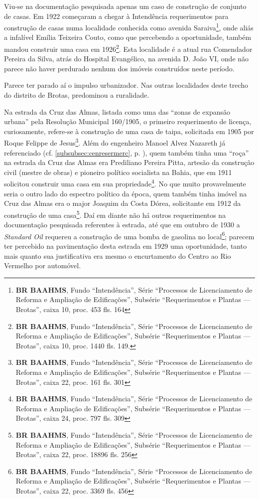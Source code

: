 Viu-se na documentação pesquisada apenas um caso de construção de conjunto de casas. Em 1922 começaram a chegar à Intendência requerimentos para construção de casas numa localidade conhecida como avenida Saraiva\footnote{\textbf{BR BAAHMS}, Fundo ``Intendência'', Série ``Processos de Licenciamento de Reforma e Ampliação de Edificações'', Subsérie ``Requerimentos e Plantas --- Brotas'', caixa 10, proc. 453 fls. 164}, onde aliás a infalível Emília Teixeira Couto, como que percebendo a oportunidade, também mandou construir uma casa em 1926\footnote{\textbf{BR BAAHMS}, Fundo ``Intendência'', Série ``Processos de Licenciamento de Reforma e Ampliação de Edificações'', Subsérie ``Requerimentos e Plantas --- Brotas'', caixa 10, proc. 1440 fls. 149.}. Esta localidade é a atual rua Comendador Pereira da Silva, atrás do Hospital Evangélico, na avenida D. João VI, onde não parece não haver perdurado nenhum dos imóveis construídos neste período.


Parece ter parado aí o impulso urbanizador. Nas outras localidades deste trecho do distrito de Brotas, predominou a ruralidade.

Na estrada da Cruz das Almas, listada como uma das ``zonas de expansão urbana'' pela Resolução Municipal 160/1905, o primeiro requerimento de licença, curiosamente, refere-se à construção de uma casa de taipa, solicitada em 1905 por Roque Felippe de Jesus\footnote{\textbf{BR BAAHMS}, Fundo ``Intendência'', Série ``Processos de Licenciamento de Reforma e Ampliação de Edificações'', Subsérie ``Requerimentos e Plantas --- Brotas'', caixa 22, proc. 161 fls. 301}. Além do engenheiro Manoel Alvez Nazareth já referenciado (cf. \autoref{subsubsec:cenresermerc}, p. \pageref{subsubsec:cenresermerc}), quem também tinha uma ``roça'' na estrada da Cruz das Almas era Prediliano Pereira Pitta, artesão da construção civil (mestre de obras) e pioneiro político socialista na Bahia, que em 1911 solicitou construir uma casa em sua propriedade\footnote{\textbf{BR BAAHMS}, Fundo ``Intendência'', Série ``Processos de Licenciamento de Reforma e Ampliação de Edificações'', Subsérie ``Requerimentos e Plantas --- Brotas'', caixa 24, proc. 797 fls. 309}. No que muito provavelmente seria o outro lado do espectro político da época, quem também tinha imóvel na Cruz das Almas era o major Joaquim da Costa Dórea, solicitante em 1912 da construção de uma casa\footnote{\textbf{BR BAAHMS}, Fundo ``Intendência'', Série ``Processos de Licenciamento de Reforma e Ampliação de Edificações'', Subsérie ``Requerimentos e Plantas --- Brotas'', caixa 22, proc. 18896 fls. 256}. Daí em diante não há outros requerimentos na documentação pesquisada referentes à estrada, até que em outubro de 1930 a \textit{Standard Oil} requereu a construção de uma bomba de gasolina no local\footnote{\textbf{BR BAAHMS}, Fundo ``Intendência'', Série ``Processos de Licenciamento de Reforma e Ampliação de Edificações'', Subsérie ``Requerimentos e Plantas --- Brotas'', caixa 22, proc. 3369 fls. 456}; parecem ter percebido na pavimentação desta estrada em 1929 uma oportunidade, tanto mais quanto sua justificativa era mesmo o encurtamento do Centro ao Rio Vermelho por automóvel.

